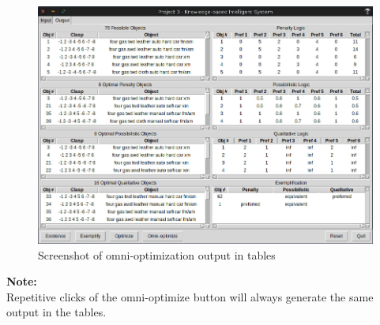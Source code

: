 \documentclass[12pt]{report}
\begin{document}
\begin{description}[leftmargin=4em]
\begin{figure}[H]
\begin{center}
\includegraphics[scale=0.3,trim=1cm 1cm 1cm 1cm]{post_omni-optimize}
\caption{Screenshot of omni-optimization output in tables}
\end{center}
\end{figure}
\vspace{-2.5em}
\end{description}

\textbf{Note:} \\
Repetitive clicks of the omni-optimize button will always generate the same output in the tables.
\end{document}
